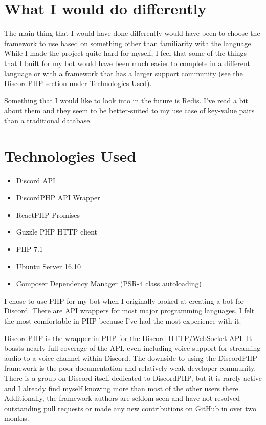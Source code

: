 \documentclass[12pt]{article} %
\begin{document}
\section*{What I would do differently}

The main thing that I would have done differently would have been to choose the framework to use based on something other than familiarity with the language. While I made the project quite hard for myself, I feel that some of the things that I built for my bot would have been much easier to complete in a different language or with a framework that has a larger support community (see the DiscordPHP section under Technologies Used).

Something that I would like to look into in the future is Redis. I've read a bit about them and they seem to be better-suited to my use case of key-value pairs than a traditional database.


\section*{Technologies Used}

\begin{itemize}
    \item Discord API
    \item DiscordPHP API Wrapper
    \item ReactPHP Promises
    \item Guzzle PHP HTTP client
    \item PHP 7.1
    \item Ubuntu Server 16.10
    \item Composer Dependency Manager (PSR-4 class autoloading)
\end{itemize}

I chose to use PHP for my bot when I originally looked at creating a bot for Discord. There are API wrappers for most major programming languages. I felt the most comfortable in PHP because I've had the most experience with it.

DiscordPHP is the wrapper in PHP for the Discord HTTP/WebSocket API. It boasts nearly full coverage of the API, even including voice support for streaming audio to a voice channel within Discord. The downside to using the DiscordPHP framework is the poor documentation and relatively weak developer community. There is a group on Discord itself dedicated to DiscordPHP, but it is rarely active and I already find myself knowing more than most of the other users there. Additionally, the framework authors are seldom seen and have not resolved outstanding pull requests or made any new contributions on GitHub in over two months.
\end{document}
